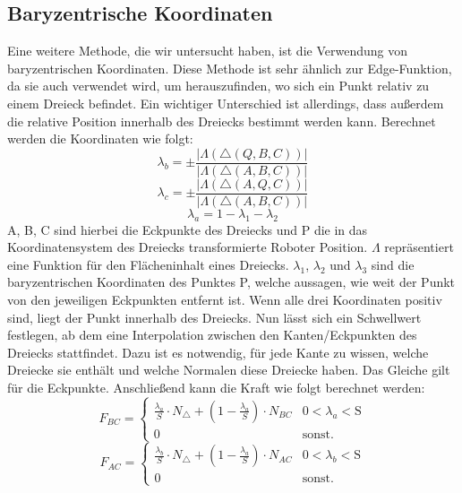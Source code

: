 \documentclass[conference]{IEEEtran}
\begin{document}
\subsection{Baryzentrische Koordinaten} \label{bary}
Eine weitere Methode, die wir untersucht haben, ist die Verwendung von baryzentrischen Koordinaten. 
Diese Methode ist sehr ähnlich zur Edge-Funktion, da sie auch verwendet wird, um herauszufinden, 
wo sich ein Punkt relativ zu einem Dreieck befindet. Ein wichtiger Unterschied ist allerdings, dass außerdem die relative Position innerhalb des Dreiecks bestimmt werden kann. Berechnet werden die Koordinaten wie folgt:
\begin{equation*}
    \lambda_b = \pm\frac{|\Lambda(\triangle(Q,B,C))|}{|\Lambda(\triangle(A,B,C))|}
\end{equation*}
\begin{equation}
    \lambda_c = \pm\frac{|\Lambda(\triangle(A,Q,C))|}{|\Lambda(\triangle(A,B,C))|}
\end{equation}
\begin{equation*}
    \lambda_a = 1 - \lambda_1 - \lambda_2
\end{equation*}
A, B, C sind hierbei die Eckpunkte des Dreiecks und P die in das Koordinatensystem des Dreiecks transformierte Roboter Position. $\Lambda$ repräsentiert eine Funktion für den Flächeninhalt eines Dreiecks. $\lambda_1$, $\lambda_2$ und $\lambda_3$ sind die baryzentrischen Koordinaten des Punktes P, welche aussagen, wie weit der Punkt von den jeweiligen Eckpunkten entfernt ist. 
Wenn alle drei Koordinaten positiv sind, liegt der Punkt innerhalb des Dreiecks. Nun lässt sich ein 
Schwellwert festlegen, ab dem eine Interpolation zwischen den Kanten/Eckpunkten des Dreiecks stattfindet. 
Dazu ist es notwendig, für jede Kante zu wissen, welche Dreiecke sie enthält und welche Normalen diese 
Dreiecke haben. Das Gleiche gilt für die Eckpunkte. Anschließend kann die Kraft wie folgt 
berechnet werden:
\begin{equation*}
    F_{BC} = 
    \begin{cases} 
        \frac{\lambda_a}{S}\cdot N_{\triangle} + (1-\frac{\lambda_a}{S})\cdot N_{BC} &  0 < \lambda_a < \text{S} \\
        0 & \text{sonst.}
    \end{cases}
\end{equation*}
\begin{equation*}
    F_{AC} = 
    \begin{cases} 
        \frac{\lambda_b}{S}\cdot N_{\triangle} + (1-\frac{\lambda_a}{S})\cdot N_{AC} &  0 < \lambda_b < \text{S} \\
        0 & \text{sonst.}
    \end{cases}
\end{equation*}
\end{document}
